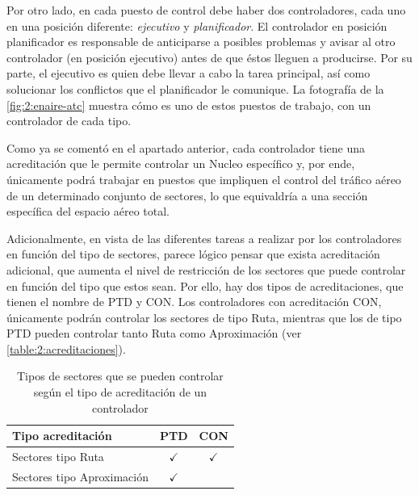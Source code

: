Por otro lado, en cada puesto de control debe haber dos controladores, cada uno en una posición diferente: 
\textit{ejecutivo} y \textit{planificador}. El controlador en posición planificador es responsable de anticiparse a posibles problemas y avisar al otro controlador (en posición ejecutivo) antes de que éstos lleguen a producirse. Por su parte, el ejecutivo es quien debe llevar a cabo la tarea principal, así como solucionar los conflictos que el planificador le comunique. La fotografía de la \autoref{fig:2:enaire-atc} muestra cómo es uno de estos puestos de trabajo, con un controlador de cada tipo.

Como ya se comentó en el apartado anterior, cada controlador tiene una acreditación que le permite controlar un \gls{Nucleo} específico y, por ende, únicamente podrá trabajar en puestos que impliquen el control del 
tráfico aéreo de un determinado conjunto de sectores, lo que equivaldría a una sección específica del espacio aéreo total.

Adicionalmente, en vista de las diferentes tareas a realizar por los controladores en función del tipo de sectores, parece lógico pensar que exista acreditación adicional, que aumenta el nivel de restricción de los sectores que puede controlar en función del tipo que estos sean. Por ello, hay dos tipos de acreditaciones, que tienen el nombre de PTD y CON. Los controladores con acreditación CON, únicamente podrán controlar los sectores de tipo Ruta, mientras que los de tipo PTD pueden controlar tanto Ruta como Aproximación (ver \autoref{table:2:acreditaciones}).



\begin{table}[h]
	\centering
	\caption[Tipos de sectores según la acreditación del controlador]{Tipos de sectores que se pueden controlar según el tipo de acreditación de un controlador}
	\begin{tabular}{lcc}
		\hline
		\textbf{Tipo acreditación} & \textbf{PTD} & \textbf{CON} \\ \hline
		Sectores tipo Ruta         & $\checkmark$ & $\checkmark$ \\
		Sectores tipo Aproximación & $\checkmark$ &              \\ \hline
	\end{tabular}
	\label{table:2:acreditaciones}
\end{table}
%

